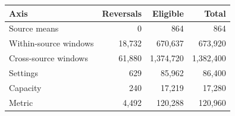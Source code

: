 \begin{tabular}{@{}lrrr@{}}\toprule
Axis & Reversals & Eligible & Total \\\midrule
Source means & 0 & 864 & 864 \\
Within-source windows & 18,732 & 670,637 & 673,920 \\
Cross-source windows & 61,880 & 1,374,720 & 1,382,400 \\
Settings & 629 & 85,962 & 86,400 \\
Capacity & 240 & 17,219 & 17,280 \\
Metric & 4,492 & 120,288 & 120,960 \\
\bottomrule\end{tabular}
